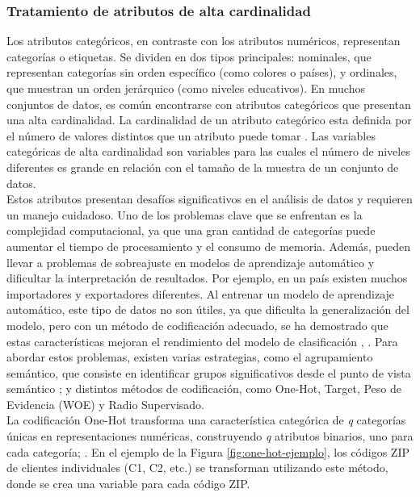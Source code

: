 \subsubsection*{Tratamiento de atributos de alta cardinalidad}\label{alta-cardinalidad}
Los atributos categóricos, en contraste con los atributos numéricos, representan categorías o etiquetas. Se dividen en dos tipos principales: nominales, que representan categorías sin orden específico (como colores o países), y ordinales, que muestran un orden jerárquico (como niveles educativos). En muchos conjuntos de datos, es común encontrarse con atributos categóricos que presentan una alta cardinalidad. La cardinalidad de un atributo categórico esta definida por el número de valores distintos que un atributo puede tomar \citep{moeyersoms2015including}. Las variables categóricas de alta cardinalidad son variables para las cuales el número de niveles diferentes es grande en relación con el tamaño de la muestra de un conjunto de datos. \\
Estos atributos presentan desafíos significativos en el análisis de datos y requieren un manejo cuidadoso. Uno de los problemas clave que se enfrentan es la complejidad computacional, ya que una gran cantidad de categorías puede aumentar el tiempo de procesamiento y el consumo de memoria. Además, pueden llevar a problemas de sobreajuste en modelos de aprendizaje automático y dificultar la interpretación de resultados. Por ejemplo, en un país existen muchos importadores y exportadores diferentes. Al entrenar un modelo de aprendizaje automático, este tipo de datos no son útiles, ya que dificulta la generalización del modelo, pero con un método de codificación adecuado, se ha demostrado que estas características mejoran el rendimiento del modelo de clasificación \citep{hooi2022feature}, \citep{cerda2020encoding}. Para abordar estos problemas, existen varias estrategias, como el agrupamiento semántico, que consiste en identificar grupos significativos desde el punto de vista semántico \citep{cerda2018similarity}; y distintos métodos de codificación, como One-Hot, Target, Peso de Evidencia (WOE) y Radio Supervisado. \\
La codificación One-Hot transforma una característica categórica de \textit{q} categorías únicas en representaciones numéricas, construyendo \textit{q} atributos binarios, uno para cada categoría; \citep{avanzi2023machine}. En el ejemplo de la Figura \ref{fig:one-hot-ejemplo}, los códigos ZIP de clientes individuales (C1, C2, etc.) se transforman utilizando este método, donde se crea una variable  para cada código ZIP. \\
